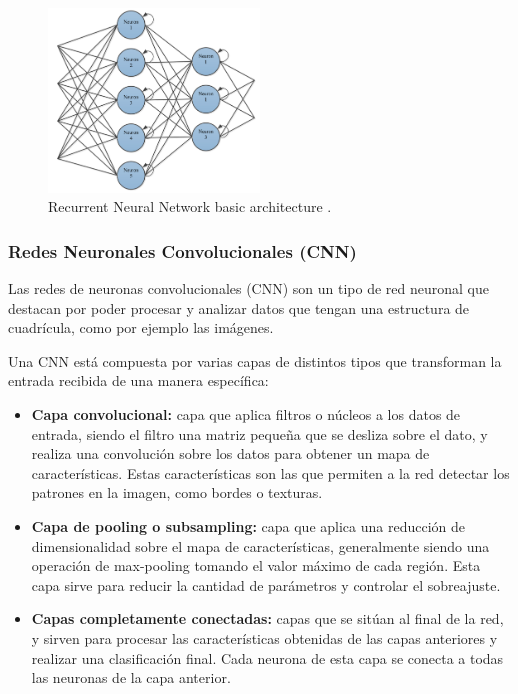 \documentclass[12pt]{report} %
\begin{document}
\begin{figure}[H]
	\centering
	\includegraphics[width=0.5\textwidth]{rnnStructure.png}
	\caption{Recurrent Neural Network basic architecture \cite{annReview}.}
	\label{fig:imagen26}
\end{figure}

\subsubsection{Redes Neuronales Convolucionales (CNN)}

Las  redes de neuronas convolucionales (CNN) son un tipo de red neuronal que destacan por poder procesar y analizar datos que tengan una estructura de cuadrícula, como por ejemplo las imágenes. 
\cite{artInt} \cite{annReview}

Una CNN está compuesta por varias capas de distintos tipos que transforman la entrada recibida de una manera específica:

\begin{itemize}

    \item \textbf{Capa convolucional:} capa que aplica filtros o núcleos a los datos de entrada, siendo el filtro una matriz pequeña que se desliza sobre el dato, y realiza una convolución sobre los datos para obtener un mapa de características. Estas características son las que permiten a la red detectar los patrones en la imagen, como bordes o texturas.
    \item \textbf{Capa de pooling o subsampling:} capa que aplica una reducción de dimensionalidad sobre el mapa de características, generalmente siendo una operación de max-pooling tomando el valor máximo de cada región. Esta capa sirve para reducir la cantidad de parámetros y controlar el sobreajuste.
    \item \textbf{Capas completamente conectadas:} capas que se sitúan al final de la red, y sirven para procesar las características obtenidas de las capas anteriores y realizar una clasificación final. Cada neurona de esta capa se conecta a todas las neuronas de la capa anterior.

\end{itemize}
\end{document}
